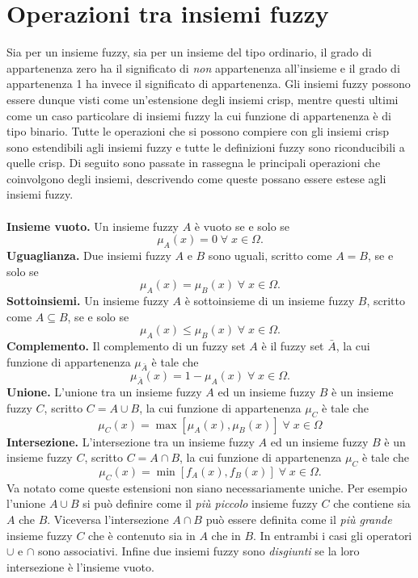\documentclass [11pt,a4paper,twoside,openright] {book}
\begin{document}
\section{Operazioni tra insiemi fuzzy}
Sia per un insieme fuzzy, sia per un insieme del tipo ordinario, il grado di appartenenza zero ha il significato di \textit{non} appartenenza all'insieme e il grado di appartenenza 1 ha invece il significato di appartenenza. Gli insiemi fuzzy possono essere dunque visti come un'estensione degli insiemi crisp, mentre questi ultimi come un caso particolare di insiemi fuzzy la cui funzione di appartenenza è di tipo binario. Tutte le operazioni che si possono compiere con gli insiemi crisp sono estendibili agli insiemi fuzzy e tutte le definizioni fuzzy sono riconducibili a quelle crisp. Di seguito sono passate in rassegna le principali operazioni che coinvolgono degli insiemi, descrivendo come queste possano essere estese agli insiemi fuzzy.\\\\
\textbf{Insieme vuoto.} Un insieme fuzzy $A$ è vuoto se e solo se
\begin{equation} \mu_A(x) = 0 \; \forall \; x \in \Omega.\end{equation} 
\textbf{Uguaglianza.} Due insiemi fuzzy $A$ e $B$ sono uguali, scritto come $A=B$, se e solo se
\begin{equation} \mu_A(x) = \mu_B(x) \; \forall \; x \in \Omega.\end{equation} 
\textbf{Sottoinsiemi.} Un insieme fuzzy $A$ è sottoinsieme di un insieme fuzzy $B$, scritto come $A \subseteq B$, se e solo se
\begin{equation} \mu_A(x) \leq \mu_B(x) \; \forall \; x \in \Omega.\end{equation} 
\textbf{Complemento.} Il complemento di un fuzzy set $A$ è il fuzzy set $\bar{A}$, la cui funzione di appartenenza $\mu_{\bar{A}}$ è tale che
\begin{equation} \mu_{\bar{A}}(x) = 1-\mu_A(x) \; \forall \; x \in \Omega.\end{equation} 
\textbf{Unione.} L'unione tra un insieme fuzzy $A$ ed un insieme fuzzy $B$ è un insieme fuzzy $C$, scritto $C=A \cup B$, la cui funzione di appartenenza $\mu_C$ è tale che
\begin{equation} \mu_C(x) = \max[\mu_A(x), \mu_B(x)] \; \forall \; x \in \Omega\end{equation} 
\textbf{Intersezione.} L'intersezione tra un insieme fuzzy $A$ ed un insieme fuzzy $B$ è un insieme fuzzy $C$, scritto $C=A \cap B$, la cui funzione di appartenenza $\mu_C$ è tale che
\begin{equation} \mu_C(x) = \min[f_A(x), f_B(x)] \; \forall \; x \in \Omega.\end{equation} 
Va notato come queste estensioni non siano necessariamente uniche. Per esempio l'unione $A \cup B$ si può definire come il \textit{più piccolo} insieme fuzzy $C$ che contiene sia $A$ che $B$. Viceversa l'intersezione $A \cap B$ può essere definita come il \textit{più grande} insieme fuzzy $C$ che è contenuto sia in $A$ che in $B$. In entrambi i casi gli operatori $\cup$ e $\cap$ sono associativi. Infine due insiemi fuzzy sono \textit{disgiunti} se la loro intersezione è l'insieme vuoto.
\end{document}

